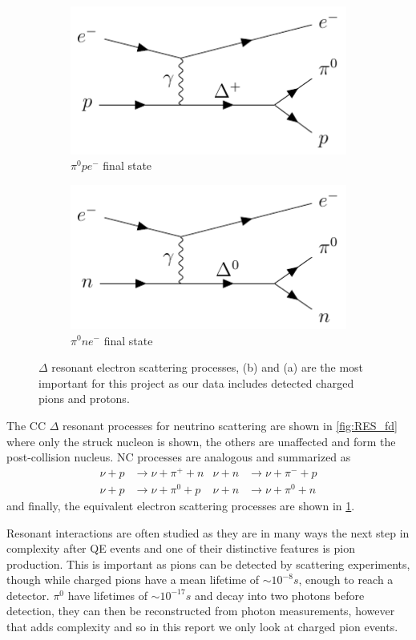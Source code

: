 \documentclass[a4paper,12pt]{article}
\begin{document}
\begin{figure}[H]
    \begin{subfigure}[b]{0.45\textwidth}
        \centering
        \includegraphics{figures/fds/RESel3.pdf}
        \caption{
            $\pi^0pe^-$ final state
        }
    \end{subfigure}
    \begin{subfigure}[b]{0.45\textwidth}
        \centering
        \includegraphics{figures/fds/RESel4.pdf}
        \caption{
            $\pi^0ne^-$ final state
        }
    \end{subfigure}
    \caption{
        $\Delta$ resonant electron scattering processes, (b) and (a) are the most important for this project as our data includes detected charged pions and protons.
    }\label{fig:RESel_fd}
\end{figure}

The CC $\Delta$ resonant processes for neutrino scattering are shown in \cref{fig:RES_fd} where only the struck nucleon is shown, the others are unaffected and form the post-collision nucleus.
NC processes are analogous and summarized as
\begin{align}
    \nu + p &\rightarrow \nu + \pi^+ + n & \nu + n &\rightarrow \nu + \pi^- + p \\
    \nu + p &\rightarrow \nu + \pi^0 + p & \nu + n &\rightarrow \nu + \pi^0 + n
\end{align}
and finally, the equivalent electron scattering processes are shown in \cref{fig:RESel_fd}.

Resonant interactions are often studied as they are in many ways the next step in complexity after QE events and one of their distinctive features is pion production.
This is important as pions can be detected by scattering experiments, though while charged pions have a mean lifetime of $\sim 10^{-8} \si{s}$, enough to reach a detector.
$\pi^0$ have lifetimes of $\sim 10^{-17} \si{s}$ \cite{particledatagroupReviewParticlePhysics2022} and decay into two photons before detection, they can then be reconstructed from photon measurements, however that adds complexity and so in this report we only look at charged pion events.
\end{document}
